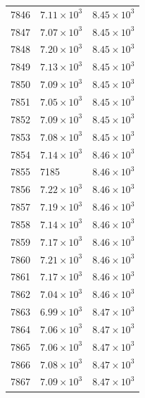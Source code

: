 \begin{table}[H]
\begin{tabular}{lll}
7846 & $\displaystyle 7.11 \times 10^{3}$ & $\displaystyle 8.45 \times 10^{3}$ \\
7847 & $\displaystyle 7.07 \times 10^{3}$ & $\displaystyle 8.45 \times 10^{3}$ \\
7848 & $\displaystyle 7.20 \times 10^{3}$ & $\displaystyle 8.45 \times 10^{3}$ \\
7849 & $\displaystyle 7.13 \times 10^{3}$ & $\displaystyle 8.45 \times 10^{3}$ \\
7850 & $\displaystyle 7.09 \times 10^{3}$ & $\displaystyle 8.45 \times 10^{3}$ \\
7851 & $\displaystyle 7.05 \times 10^{3}$ & $\displaystyle 8.45 \times 10^{3}$ \\
7852 & $\displaystyle 7.09 \times 10^{3}$ & $\displaystyle 8.45 \times 10^{3}$ \\
7853 & $\displaystyle 7.08 \times 10^{3}$ & $\displaystyle 8.45 \times 10^{3}$ \\
7854 & $\displaystyle 7.14 \times 10^{3}$ & $\displaystyle 8.46 \times 10^{3}$ \\
7855 & 7185 & $\displaystyle 8.46 \times 10^{3}$ \\
7856 & $\displaystyle 7.22 \times 10^{3}$ & $\displaystyle 8.46 \times 10^{3}$ \\
7857 & $\displaystyle 7.19 \times 10^{3}$ & $\displaystyle 8.46 \times 10^{3}$ \\
7858 & $\displaystyle 7.14 \times 10^{3}$ & $\displaystyle 8.46 \times 10^{3}$ \\
7859 & $\displaystyle 7.17 \times 10^{3}$ & $\displaystyle 8.46 \times 10^{3}$ \\
7860 & $\displaystyle 7.21 \times 10^{3}$ & $\displaystyle 8.46 \times 10^{3}$ \\
7861 & $\displaystyle 7.17 \times 10^{3}$ & $\displaystyle 8.46 \times 10^{3}$ \\
7862 & $\displaystyle 7.04 \times 10^{3}$ & $\displaystyle 8.46 \times 10^{3}$ \\
7863 & $\displaystyle 6.99 \times 10^{3}$ & $\displaystyle 8.47 \times 10^{3}$ \\
7864 & $\displaystyle 7.06 \times 10^{3}$ & $\displaystyle 8.47 \times 10^{3}$ \\
7865 & $\displaystyle 7.06 \times 10^{3}$ & $\displaystyle 8.47 \times 10^{3}$ \\
7866 & $\displaystyle 7.08 \times 10^{3}$ & $\displaystyle 8.47 \times 10^{3}$ \\
7867 & $\displaystyle 7.09 \times 10^{3}$ & $\displaystyle 8.47 \times 10^{3}$ \\

\end{tabular}
\end{table}

